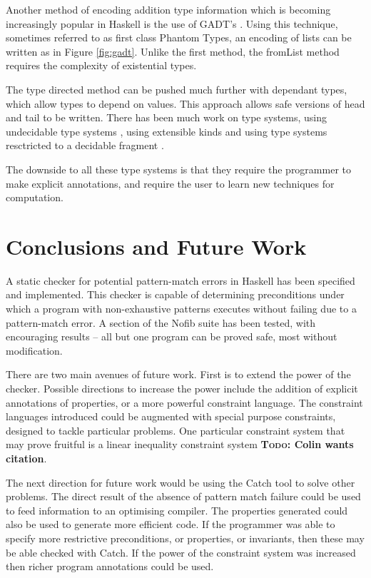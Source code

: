 \documentclass[preprint]{sigplanconf}
\newcommand{\C}[1]{\textsf{#1}}
\newcommand{\todo}[1]{\textbf{\textsc{Todo:} #1}}
\begin{document}
Another method of encoding addition type information which is becoming increasingly popular in Haskell is the use of GADT's \citep{gadt}. Using this technique, sometimes referred to as first class Phantom Types, an encoding of lists can be written as in Figure \ref{fig:gadt}. Unlike the first method, the \C{fromList} method requires the complexity of existential types.

The type directed method can be pushed much further with dependant types, which allow types to depend on values. This approach allows safe versions of \C{head} and \C{tail} to be written. There has been much work on type systems, using undecidable type systems \citep{cayenne, epigram}, using extensible kinds \citep{omega} and using type systems resctricted to a decidable fragment \citep{xi:dependent_practical}.

The downside to all these type systems is that they require the programmer to make explicit annotations, and require the user to learn new techniques for computation.


\section{Conclusions and Future Work}
\label{sec:conclusion}

A static checker for potential pattern-match errors in Haskell has been specified and implemented. This checker is capable of determining preconditions under which a program with non-exhaustive patterns executes without failing due to a pattern-match error. A section of the Nofib suite has been tested, with encouraging results -- all but one program can be proved safe, most without modification.

There are two main avenues of future work. First is to extend the power of the checker. Possible directions to increase the power include the addition of explicit annotations of properties, or a more powerful constraint language. The constraint languages introduced could be augmented with special purpose constraints, designed to tackle particular problems. One particular constraint system that may prove fruitful is a linear inequality constraint system \todo{Colin wants citation}.

The next direction for future work would be using the Catch tool to solve other problems. The direct result of the absence of pattern match failure could be used to feed information to an optimising compiler. The properties generated could also be used to generate more efficient code. If the programmer was able to specify more restrictive preconditions, or properties, or invariants, then these may be able checked with Catch. If the power of the constraint system was increased then richer program annotations could be used.
\end{document}
